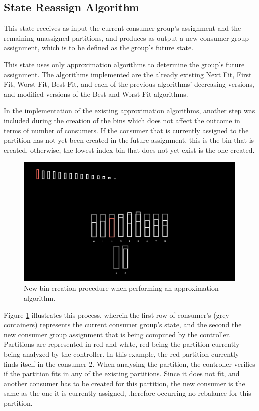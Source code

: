 \subsection{State Reassign Algorithm}

This state receives as input the current consumer group's assignment and the remaining unassigned partitions, and produces as output a new consumer group assignment, which is to be defined as the group's future state.

This state uses only approximation algorithms to determine the group's future assignment. The algorithms implemented are the already existing Next Fit, First Fit, Worst Fit, Best Fit, and each of the previous algorithms' decreasing versions, and modified versions of the Best and Worst Fit algorithms. 

In the implementation of the existing approximation algorithms, another step was included during the creation of the bins which does not affect the outcome in terms of number of consumers. If the consumer that is currently assigned to the partition has not yet been created in the future assignment, this is the bin that is created, otherwise, the lowest index bin that does not yet exist is the one created.
 
\begin{figure}[H]
    \centering
    \includegraphics[width=\textwidth]{images/ApproximationAlgorithm_NewBin.jpg}
\caption{New bin creation procedure when performing an approximation algorithm.}
\label{fig:approximation_bin_creation}
\end{figure}

Figure \ref{fig:approximation_bin_creation} illustrates this process, wherein the first row of consumer's (grey containers) represents the current consumer group's state, and the second the new consumer group assignment that is being computed by the controller. Partitions are represented in red and white, red being the partition currently being analyzed by the controller. In this example, the red partition currently finds itself in the consumer 2. When analysing the partition, the controller verifies if the partition fits in any of the existing partitions. Since it does not fit, and another consumer has to be created for this partition, the new consumer is the same as the one it is currently assigned, therefore occurring no rebalance for this partition.

